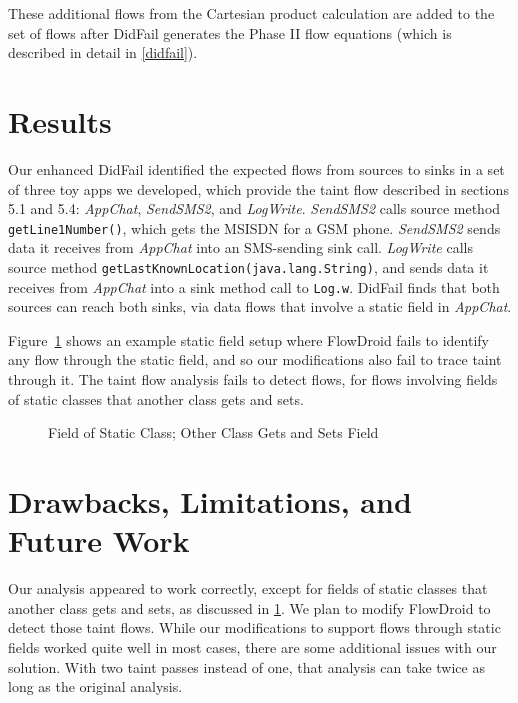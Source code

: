 These additional flows from the Cartesian product calculation are added to the set of flows after DidFail generates the Phase II flow equations (which is described in detail in \ref{didfail}). 

\section{Results} \label{sec:static-results}
Our enhanced DidFail identified the expected flows from sources to sinks in a set of three toy apps we developed, which provide the taint flow described in sections 5.1 and 5.4: \emph{AppChat}, \emph{SendSMS2}, and \emph{LogWrite}. \emph{SendSMS2} calls source method \texttt{getLine1Number()},  which gets the MSISDN for a GSM phone.  \emph{SendSMS2} sends data it receives from \emph{AppChat} into an SMS-sending sink call. \emph{LogWrite} calls source method \texttt{getLastKnownLocation(java.lang.String)}, and sends data it receives from \emph{AppChat} into a sink method call to \texttt{Log.w}. DidFail finds that both sources can reach both sinks, via  data flows that involve a static field in \emph{AppChat}. 

Figure~\ref{fig:staticAnalysisProblem} shows an example static field setup where FlowDroid fails to identify any flow through the static field, and so our modifications also fail to trace taint through it.  The taint flow analysis fails to detect flows, for flows involving fields of static classes that another class gets and sets.

\begin{figure}
\begin{framed}
\begin{center}
\begin{minipage}{0.85\textwidth}

\end{minipage}
\end{center}
\caption{Field of Static Class; Other Class Gets and Sets Field}
\label{fig:staticAnalysisProblem}
\end{framed}
\end{figure}


\section{Drawbacks, Limitations, and Future Work}

Our analysis appeared to work correctly, except for fields of static classes that another class gets and sets, as discussed in \ref{sec:static-results}. We plan to modify FlowDroid to detect those taint flows. While our modifications to support flows through static fields worked quite well in most cases, there are some additional issues with our solution. With two taint passes instead of one, that analysis can take twice as long as the original analysis. 

